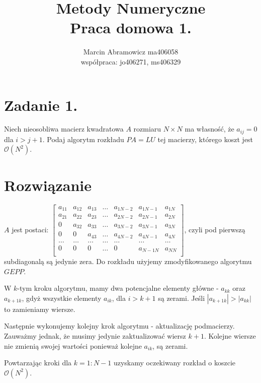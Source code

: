 \documentclass[a4paper]{article}
\title{\vspace{-1cm}
    Metody Numeryczne \\
    \large Praca domowa 1.
}
\author{
    Marcin Abramowicz ma406058 \\
    \small współpraca: jo406271, ms406329
}
\begin{document}
    \maketitle

    \section*{Zadanie 1.}

        Niech nieosobliwa macierz kwadratowa $A$ rozmiaru $N \times N$  ma własność, że  $a_{ij} = 0$ dla $i > j + 1$.
        Podaj algorytm rozkładu $PA=LU$ tej macierzy, którego koszt jest $\mathcal{O}(N^2)$.


    \section*{\large Rozwiązanie}

        $A$ jest postaci:
        $\begin{bmatrix}
           a_{11} & a_{12} & a_{13} & \dots & a_{1N-2} & a_{1N-1} & a_{1N} \\
           a_{21} & a_{22} & a_{23} & \dots & a_{2N-2} & a_{2N-1} & a_{2N} \\
           0      & a_{32} & a_{33} & \dots & a_{3N-2} & a_{3N-1} & a_{3N} \\
           0      & 0      & a_{43} & \dots & a_{4N-2} & a_{4N-1} & a_{4N} \\
           \dots  & \dots  & \dots  & \dots & \dots    & \dots    & \dots  \\
           0      & 0      & 0      & \dots & 0        & a_{N-1N} & a_{NN} \\
        \end{bmatrix}$,
        czyli pod pierwszą subdiagonalą są jedynie zera.
        Do rozkładu użyjemy zmodyfikowanego algorytmu $GEPP$.

        W $k$-tym kroku algorytmu, mamy dwa potencjalne elementy główne - $a_{kk}$ oraz $a_{k+1k}$,
        gdyż wszystkie elementy $a_{ik}$, dla $i > k + 1$ są zerami.
        Jeśli $|a_{k+1k}| > |a_{kk}|$ to zamieniamy wiersze.

        Następnie wykonujemy kolejny krok algorytmu - aktualizację podmacierzy.
        Zauważmy jednak, że musimy jedynie zaktualizować wiersz $k+1$.
        Kolejne wiersze nie zmienią swojej wartości ponieważ kolejne $a_{ik}$, są zerami.

        Powtarzając kroki dla $k = 1 : N - 1$ uzyskamy oczekiwany rozkład o koszcie $\mathcal{O}(N^2)$. \\
\end{document}
